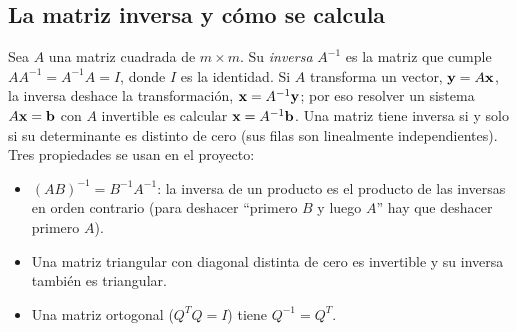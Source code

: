 
\subsection{La matriz inversa y cómo se calcula}\label{sec:inversa}

Sea $A$ una matriz cuadrada de $m\times m$. Su \emph{inversa} $A^{-1}$ es la matriz que cumple
$AA^{-1}=A^{-1}A=I$, donde $I$ es la identidad. Si $A$ transforma un vector, $\mathbf{y}=A\mathbf{x}$,
la inversa deshace la transformación, $\mathbf{x}=A^{-1}\mathbf{y}$; por eso resolver un sistema $A\mathbf{x}=\mathbf{b}$
con $A$ invertible es calcular $\mathbf{x}=A^{-1}\mathbf{b}$. Una matriz tiene inversa si y solo si su
determinante es distinto de cero (sus filas son linealmente independientes). Tres propiedades
se usan en el proyecto:
\begin{itemize}
  \item $(AB)^{-1}=B^{-1}A^{-1}$: la inversa de un producto es el producto de las inversas en
        orden contrario (para deshacer ``primero $B$ y luego $A$'' hay que deshacer primero $A$).
  \item Una matriz triangular con diagonal distinta de cero es invertible y su inversa también es triangular.
  \item Una matriz ortogonal ($Q^{T}Q=I$) tiene $Q^{-1}=Q^{T}$.
\end{itemize}

